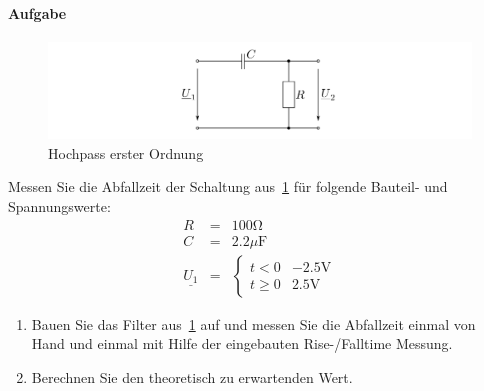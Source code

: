 \documentclass[10pt]{scrreprt}
\begin{document}
    \paragraph{Aufgabe}
    \begin{center}
        \begin{figure}[H]
            \includegraphics[width=\textwidth]{abb8.png}
            \caption{Hochpass erster Ordnung}
            \label{fig:abb8}
        \end{figure}
    \end{center}
    Messen Sie die Abfallzeit der Schaltung aus~\ref{fig:abb8} für folgende Bauteil- und
    Spannungswerte:
    \begin{eqnarray*}
        R &=& 100\si{\ohm}\\
        C &=& 2.2\si{\mu \farad}\\
            \underline{U_1} &=&
            \begin{cases}
                t < 0& -2.5\si{\volt}\\
                t \geq 0& 2.5\si{\volt}
            \end{cases}
    \end{eqnarray*}
    \begin{enumerate}
        \item Bauen Sie das Filter aus~\ref{fig:abb8} auf und messen Sie die Abfallzeit einmal von Hand
            und einmal mit Hilfe der eingebauten Rise-/Falltime Messung.
        \item Berechnen Sie den theoretisch zu erwartenden Wert.
    \end{enumerate}
\end{document}
